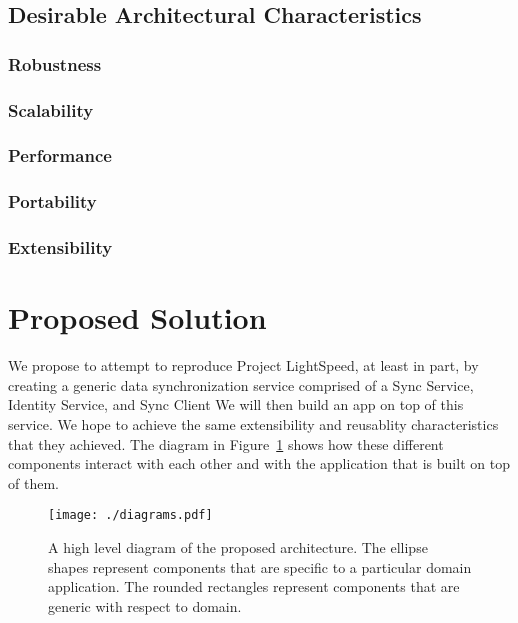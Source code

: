 \documentclass[12pt]{article}
\begin{document}
        \subsection{Desirable Architectural Characteristics}
            \subsubsection{Robustness}
            \subsubsection{Scalability}
            \subsubsection{Performance}
            \subsubsection{Portability}
            \subsubsection{Extensibility}

    \section{Proposed Solution}
    We propose to attempt to reproduce Project LightSpeed, at least in part, by creating a generic data synchronization service comprised of a Sync Service, Identity Service, and Sync Client We will then build an app on top of this service.
    We hope to achieve the same extensibility and reusablity characteristics that they achieved.
    The diagram in Figure~\ref{fig:high-level} shows how these different components interact with each other and with the application that is built on top of them.

    \begin{figure}
        \centering
        \texttt{[image: ./diagrams.pdf]}
        \caption{A high level diagram of the proposed architecture. The ellipse shapes represent components that are specific to a particular domain application. The rounded rectangles represent components that are generic with respect to domain. \label{fig:high-level}}
    \end{figure}
\end{document}

